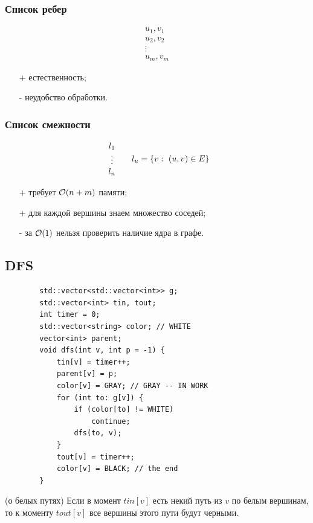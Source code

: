 \begin{multicols}{2}
    \subsubsection*{Список ребер}
    \[
        \begin{array}{l}
            u_1, v_1\\ 
            u_2, v_2\\
            \vdots\\
            u_m, v_m           
        \end{array}
    \]
    \begin{itemize}
        \item[+] естественность;
        \item[-] неудобство обработки. 
    \end{itemize}
    \subsubsection*{Список смежности}
    \useshortskip
    \[
        \begin{array}{c}
            l_1\\
            \vdots\\
            l_n
        \end{array} \hspace*{0.5cm} l_u = \{v: \ (u, v) \in E\}
    \]
    \begin{itemize}
        \item[+] требует ${\cal O}(n+m)$ памяти;
        \item[+] для каждой вершины знаем множество соседей;
        \item[-] за ${\cal O}(1)$ нельзя проверить наличие ядра в графе.  
    \end{itemize}
    \subsection*{DFS}
    \begin{lstlisting}
        std::vector<std::vector<int>> g;
        std::vector<int> tin, tout;
        int timer = 0;
        std::vector<string> color; // WHITE
        vector<int> parent;
        void dfs(int v, int p = -1) {
            tin[v] = timer++;
            parent[v] = p;
            color[v] = GRAY; // GRAY -- IN WORK
            for (int to: g[v]) {
                if (color[to] != WHITE) 
                    continue;
                dfs(to, v);
            }
            tout[v] = timer++;
            color[v] = BLACK; // the end
        }
    \end{lstlisting}
    \begin{lemma}{(о белых путях)}{}
        Если в момент $tin[v]$ есть некий путь из $v$ по белым вершинам, то к моменту $tout[v]$ все вершины этого пути будут черными.
    \end{lemma}

\end{multicols}
